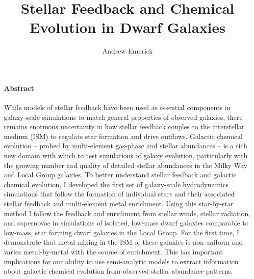 \documentclass[12pt]{article} %
\title{\vspace{-5ex} \Large Stellar Feedback and Chemical Evolution in Dwarf Galaxies
       \vspace{-2ex}}
\author{Andrew Emerick}
\date{\vspace{-5ex}}
\begin{document}
 \thispagestyle{empty}


\maketitle

{\noindent \large \textbf{Abstract}}
\\
\\
While models of stellar feedback have been used as essential components in galaxy-scale simulations to match general properties of observed galaxies, there remains enormous uncertainty in how stellar feedback couples to the interstellar medium (ISM) to regulate star formation and drive outflows. Galactic chemical evolution -- probed by multi-element gas-phase and stellar abundances -- is a rich new domain with which to test simulations of galaxy evolution, particularly with the growing number and quality of detailed stellar abundances in the Milky Way and Local Group galaxies. To better understand stellar feedback and galactic chemical evolution, I developed the first set of galaxy-scale hydrodynamics simulations that follow the formation of individual stars and their associated stellar feedback and multi-element metal enrichment. Using this star-by-star method I follow the feedback and enrichment from stellar winds, stellar radiation, and supernovae in simulations of isolated, low-mass dwarf galaxies comparable to low-mass, star forming dwarf galaxies in the Local Group. For the first time, I demonstrate that metal-mixing in the ISM of these galaxies is non-uniform and varies metal-by-metal with the source of enrichment. This has important implications for our ability to use semi-analytic models to extract information about galactic chemical evolution from observed stellar abundance patterns.
\end{document}
